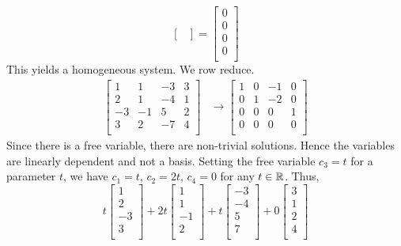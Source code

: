 \documentclass{article}
\begin{document}
\begin{example}
\[\begin{bmatrix}
      \end{bmatrix} =
      \begin{bmatrix}
        0\\0\\0\\0\\
      \end{bmatrix}
    \]
    This yields a homogeneous system. We row reduce.
    \begin{align*}
      \begin{bmatrix}
        1 & 1 & -3 & 3\\
        2 & 1 & -4 & 1\\
        -3 & -1 & 5& 2\\
        3 & 2 & -7 & 4\\
      \end{bmatrix} &\to
      \begin{bmatrix}
        1 & 0 & -1 & 0\\
        0 & 1 & -2 & 0\\
        0 & 0 & 0 & 1\\
        0 & 0 & 0 & 0\\
      \end{bmatrix}
    \end{align*}
    Since there is a free variable, there are non-trivial solutions. Hence the variables are linearly dependent and not a basis. Setting the free variable $c_3 = t$ for a parameter $t$, we have $c_1 = t$, $c_2 = 2t$, $c_4 = 0$ for any $t \in \mathbb{R}$.
    Thus,
    \[
      t
      \begin{bmatrix}
        1\\2\\-3\\3\\
      \end{bmatrix} +2t
      \begin{bmatrix}
        1\\1\\-1\\2\\
      \end{bmatrix} +t
      \begin{bmatrix}
        -3\\-4\\5\\7\\
      \end{bmatrix} +0
      \begin{bmatrix}
        3\\1\\2\\4\\

\end{bmatrix}\]
\end{example}
\end{document}
